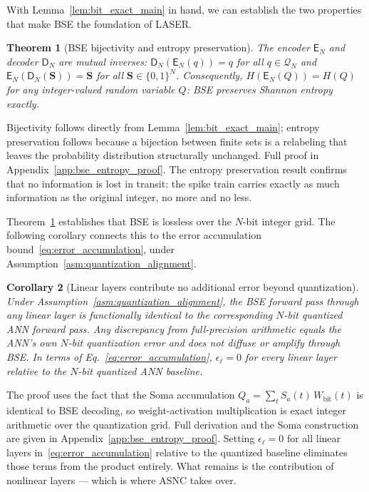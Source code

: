 \documentclass{article}
\theoremstyle{plain}
\newtheorem{theorem}{Theorem}[section]
\newtheorem{corollary}[theorem]{Corollary}
\theoremstyle{definition}
\theoremstyle{remark}
\begin{document}
With Lemma~\ref{lem:bit_exact_main} in hand, we can establish the two properties
that make BSE the foundation of LASER.

\begin{theorem}[BSE bijectivity and entropy preservation]
\label{thm:bse_main}
The encoder $\mathsf{E}_N$ and decoder $\mathsf{D}_N$ are mutual inverses:
$\mathsf{D}_N(\mathsf{E}_N(q)) = q$ for all $q \in \mathcal{Q}_N$ and
$\mathsf{E}_N(\mathsf{D}_N(\mathbf{S})) = \mathbf{S}$ for all
$\mathbf{S} \in \{0,1\}^N$. Consequently, $H(\mathsf{E}_N(Q)) = H(Q)$ for any
integer-valued random variable $Q$: BSE preserves Shannon entropy exactly.
\end{theorem}

Bijectivity follows directly from Lemma~\ref{lem:bit_exact_main}; entropy
preservation follows because a bijection between finite sets is a relabeling that
leaves the probability distribution structurally unchanged. Full proof in
Appendix~\ref{app:bse_entropy_proof}. The entropy preservation result confirms that
no information is lost in transit: the spike train carries exactly as much
information as the original integer, no more and no less.

Theorem~\ref{thm:bse_main} establishes that BSE is lossless over the $N$-bit integer
grid. The following corollary connects this to the error accumulation
bound~\eqref{eq:error_accumulation}, under Assumption~\ref{asm:quantization_alignment}.

\begin{corollary}[Linear layers contribute no additional error beyond quantization]
\label{cor:no_diffusion_main}
Under Assumption~\ref{asm:quantization_alignment}, the BSE forward pass through any
linear layer is functionally identical to the corresponding $N$-bit quantized ANN
forward pass. Any discrepancy from full-precision arithmetic equals the ANN's own
$N$-bit quantization error and does not diffuse or amplify through BSE. In terms of
Eq.~\eqref{eq:error_accumulation}, $\epsilon_\ell = 0$ for every linear layer
\emph{relative to the $N$-bit quantized ANN baseline}.
\end{corollary}

The proof uses the fact that the Soma accumulation $Q_a = \sum_t S_a(t)\,
W_{\mathrm{bit}}(t)$ is identical to BSE decoding, so weight-activation
multiplication is exact integer arithmetic over the quantization grid. Full derivation
and the Soma construction are given in Appendix~\ref{app:bse_entropy_proof}.
Setting $\epsilon_\ell = 0$ for all linear layers
in~\eqref{eq:error_accumulation} relative to the quantized baseline eliminates
those terms from the product entirely. What remains is the contribution of
nonlinear layers — which is where ASNC takes over.
\end{document}

